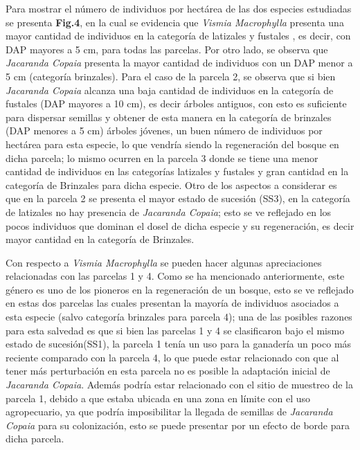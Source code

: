 \documentclass[letterpaper,9pt,onecolumn,twoside,]{pinp}
\begin{document}
Para mostrar el número de individuos por hectárea de las dos especies
estudiadas se presenta \textbf{Fig.4}, en la cual se evidencia que
\emph{Vismia Macrophylla} presenta una mayor cantidad de individuos en
la categoría de latizales y fustales , es decir, con DAP mayores a 5 cm,
para todas las parcelas. Por otro lado, se observa que \emph{Jacaranda
Copaia} presenta la mayor cantidad de individuos con un DAP menor a 5 cm
(categoría brinzales). Para el caso de la parcela 2, se observa que si
bien \emph{Jacaranda Copaia} alcanza una baja cantidad de individuos
en la categoría de fustales (DAP mayores a 10 cm), es decir árboles
antiguos, con esto es suficiente para dispersar semillas y obtener de
esta manera en la categoría de brinzales (DAP menores a 5 cm) árboles
jóvenes, un buen número de individuos por hectárea para esta especie, lo
que vendría siendo la regeneración del bosque en dicha parcela; lo mismo
ocurren en la parcela 3 donde se tiene una menor cantidad de
individuos en las categorías latizales y fustales y gran cantidad en la
categoría de Brinzales para dicha especie. Otro de los aspectos a
considerar es que en la parcela 2 se presenta el mayor estado de
sucesión (SS3), en la categoría de latizales no hay presencia de
\emph{Jacaranda Copaia}; esto se ve reflejado en los pocos individuos que
dominan el dosel de dicha especie y su regeneración, es decir mayor
cantidad en la categoría de Brinzales.

Con respecto a \emph{Vismia Macrophylla} se pueden hacer algunas
apreciaciones relacionadas con las parcelas 1 y 4. Como se ha mencionado
anteriormente, este género es uno de los pioneros en la regeneración de
un bosque, esto se ve reflejado en estas dos parcelas las cuales
presentan la mayoría de individuos asociados a esta especie (salvo
categoría brinzales para parcela 4); una de las posibles razones para
esta salvedad es que si bien las parcelas 1 y 4 se clasificaron bajo el
mismo estado de sucesión(SS1), la parcela 1 tenía un uso para la
ganadería un poco más reciente comparado con la parcela 4, lo que puede
estar relacionado con que al tener más perturbación en esta parcela no
es posible la adaptación inicial de \emph{Jacaranda Copaia}. Además
podría estar relacionado con el sitio de muestreo de la parcela 1,
debido a que estaba ubicada en una zona en límite con el uso
agropecuario, ya que podría imposibilitar la llegada de semillas de
\emph{Jacaranda Copaia} para su colonización, esto se puede presentar
por un efecto de borde para dicha parcela.
\end{document}
